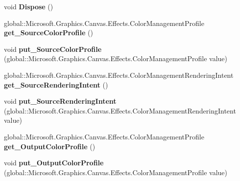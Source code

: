 \begin{DoxyCompactItemize}
void {\bfseries Dispose} ()
\item 
\mbox{\label{class_microsoft_1_1_graphics_1_1_canvas_1_1_effects_1_1_color_management_effect_a6b058fa689ed71507e964b28fe6170c5}} 
global\+::\+Microsoft.\+Graphics.\+Canvas.\+Effects.\+Color\+Management\+Profile {\bfseries get\+\_\+\+Source\+Color\+Profile} ()
\item 
\mbox{\label{class_microsoft_1_1_graphics_1_1_canvas_1_1_effects_1_1_color_management_effect_a5810de208f1afdb9ab4f2e1b99d5216f}} 
void {\bfseries put\+\_\+\+Source\+Color\+Profile} (global\+::\+Microsoft.\+Graphics.\+Canvas.\+Effects.\+Color\+Management\+Profile value)
\item 
\mbox{\label{class_microsoft_1_1_graphics_1_1_canvas_1_1_effects_1_1_color_management_effect_a3e5a8a23a3a6aa5fd2f094f13e898a44}} 
global\+::\+Microsoft.\+Graphics.\+Canvas.\+Effects.\+Color\+Management\+Rendering\+Intent {\bfseries get\+\_\+\+Source\+Rendering\+Intent} ()
\item 
\mbox{\label{class_microsoft_1_1_graphics_1_1_canvas_1_1_effects_1_1_color_management_effect_ae01d8260768b483504a24daed27da2b8}} 
void {\bfseries put\+\_\+\+Source\+Rendering\+Intent} (global\+::\+Microsoft.\+Graphics.\+Canvas.\+Effects.\+Color\+Management\+Rendering\+Intent value)
\item 
\mbox{\label{class_microsoft_1_1_graphics_1_1_canvas_1_1_effects_1_1_color_management_effect_a74ae08e1f5d954e1f9d89ddd5af9653d}} 
global\+::\+Microsoft.\+Graphics.\+Canvas.\+Effects.\+Color\+Management\+Profile {\bfseries get\+\_\+\+Output\+Color\+Profile} ()
\item 
\mbox{\label{class_microsoft_1_1_graphics_1_1_canvas_1_1_effects_1_1_color_management_effect_a8cc3db4456f5009c8bb5932d1ba34690}} 
void {\bfseries put\+\_\+\+Output\+Color\+Profile} (global\+::\+Microsoft.\+Graphics.\+Canvas.\+Effects.\+Color\+Management\+Profile value)

\end{DoxyCompactItemize}
